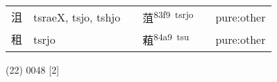 \documentclass[14pt,a4paper]{scrartcl}
\begin{document}
\begin{longtable}[c]{@{}llllll@{}}
\begin{minipage}[t]{0.14\columnwidth}\raggedright\strut
沮
\strut\end{minipage} &
\begin{minipage}[t]{0.14\columnwidth}\raggedright\strut
tsraeX, tsjo, tshjo
\strut\end{minipage} &
\begin{minipage}[t]{0.14\columnwidth}\raggedright\strut
\strut\end{minipage} &
\begin{minipage}[t]{0.14\columnwidth}\raggedright\strut
菹\textsuperscript{83f9~tsrjo}
\strut\end{minipage} &
\begin{minipage}[t]{0.14\columnwidth}\raggedright\strut
\strut\end{minipage} &
\begin{minipage}[t]{0.14\columnwidth}\raggedright\strut
pure:other
\strut\end{minipage}\tabularnewline
\begin{minipage}[t]{0.14\columnwidth}\raggedright\strut
租
\strut\end{minipage} &
\begin{minipage}[t]{0.14\columnwidth}\raggedright\strut
tsrjo
\strut\end{minipage} &
\begin{minipage}[t]{0.14\columnwidth}\raggedright\strut
\strut\end{minipage} &
\begin{minipage}[t]{0.14\columnwidth}\raggedright\strut
蒩\textsuperscript{84a9~tsu}
\strut\end{minipage} &
\begin{minipage}[t]{0.14\columnwidth}\raggedright\strut
\strut\end{minipage} &
\begin{minipage}[t]{0.14\columnwidth}\raggedright\strut
pure:other
\strut\end{minipage}\tabularnewline
\bottomrule
\end{longtable}

(22) 0048 {[}2{]}
\end{document}
